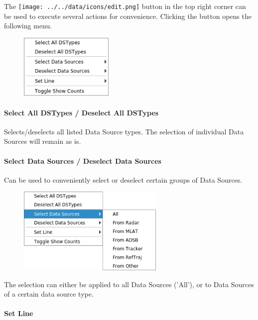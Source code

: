 The \texttt{[image: ../../data/icons/edit.png]} button in the top right corner can be used to execute several actions for convenience.
Clicking the button opens the following menu.

\begin{figure}[H]
    \center
    \includegraphics[width=4.5cm,frame]{figures/ui_data_source_configmenu.png}
\end{figure}

\paragraph{Select All DSTypes / Deselect All DSTypes}

Selects/deselects all listed Data Source types. The selection of individual Data Sources will remain as is.

\paragraph{Select Data Sources / Deselect Data Sources}

Can be used to conveniently select or deselect certain groups of Data Sources.

\begin{figure}[H]
    \center
    \includegraphics[width=7cm,frame]{figures/ui_data_source_configmenu_select.png}
\end{figure}

The selection can either be applied to all Data Sources ('All'), or to Data Sources of a certain data source type. 

\paragraph{Set Line}

